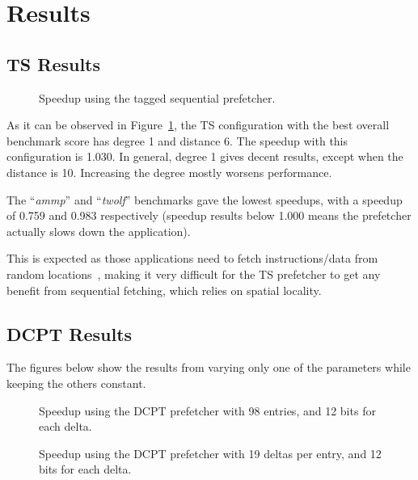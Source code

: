 \section{Results}
\label{sec:res}

\subsection{TS Results}

\begin{figure}[h!]
	\begin{centering}
		
		\caption{Speedup using the tagged sequential prefetcher.}
		\label{figure:ts}
	\end{centering}
\end{figure}

As it can be observed in Figure~\ref{figure:ts}, the TS configuration with
the best overall benchmark score has degree 1 and distance 6. The speedup with
this configuration is 1.030. In general, degree 1 gives decent results, except
when the distance is 10. Increasing the degree mostly worsens performance.

The ``\emph{ammp}'' and ``\emph{twolf}'' benchmarks gave the lowest speedups,
with a speedup of 0.759 and 0.983 respectively (speedup results below 1.000
means the prefetcher actually slows down the application).

This is expected as those applications need to fetch instructions/data from
random locations~\cite[Sec.~4.2]{spec2000-memory}, making it very difficult for
the TS prefetcher to get any benefit from sequential fetching, which relies on
spatial locality.

\subsection{DCPT Results}

The figures below show the results from varying only one of the parameters while
keeping the others constant.

\begin{figure}[h!]
	\begin{centering}
		
		\caption{Speedup using the DCPT prefetcher with 98 entries, and 12 bits for each delta.}
		\label{figure:dcpt-num-deltas}
	\end{centering}
\end{figure}

\begin{figure}[h!]
	\begin{centering}
		
		\caption{Speedup using the DCPT prefetcher with 19 deltas per entry, and 12 bits for each delta.}
		\label{figure:dcpt-table-size}
	\end{centering}
\end{figure}

